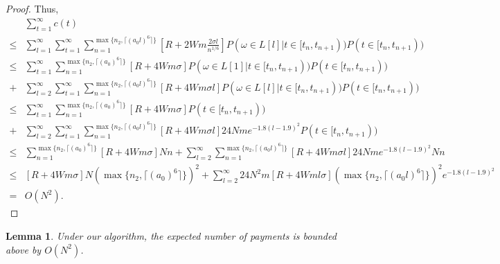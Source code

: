 \documentclass{article}
\newtheorem{lemma}{Lemma}
\begin{document}
\begin{proof}
Thus,
\begin{align}
&\sum_{t=1}^{\infty}c(t) \nonumber \\
\leq&\sum_{l=1}^{\infty}\sum_{t=1}^{\infty}\sum_{n=1}^{\max\{n_2,\lceil (a_0 l)^6 \rceil\}}\left[R+2Wm\frac{2\sigma l}{n^{1/6}}\right]P(\omega\in L[l]|t\in [t_n,t_{n+1}))P(t\in [t_n,t_{n+1})) \nonumber \\
\leq& \sum_{t=1}^{\infty}\sum_{n=1}^{\max\{n_2,\lceil (a_0)^6 \rceil\}}\left[R+4Wm\sigma \right]P(\omega\in L[1]|t\in [t_n,t_{n+1}))P(t\in [t_n,t_{n+1})) \nonumber \\
+&\sum_{l=2}^{\infty}\sum_{t=1}^{\infty}\sum_{n=1}^{\max\{n_2,\lceil (a_0 l)^6 \rceil\}}\left[R+4Wm\sigma l\right]P(\omega\in L[l]|t\in [t_n,t_{n+1}))P(t\in [t_n,t_{n+1})) \nonumber \\
\leq& \sum_{t=1}^{\infty}\sum_{n=1}^{\max\{n_2,\lceil (a_0)^6 \rceil\}}\left[R+4Wm\sigma \right]P(t\in [t_n,t_{n+1})) \nonumber \\
+&\sum_{l=2}^{\infty}\sum_{t=1}^{\infty}\sum_{n=1}^{\max\{n_2,\lceil (a_0 l)^6 \rceil\}}\left[R+4Wm\sigma l\right]24Nme^{-1.8(l-1.9)^2}P(t\in [t_n,t_{n+1})) \nonumber \\
\leq& \sum_{n=1}^{\max\{n_2,\lceil (a_0)^6 \rceil\}}\left[R+4Wm\sigma \right]Nn +\sum_{l=2}^{\infty}\sum_{n=1}^{\max\{n_2,\lceil (a_0 l)^6 \rceil\}}\left[R+4Wm\sigma l\right]24Nme^{-1.8(l-1.9)^2}Nn \nonumber \\
\leq & \left[R+4Wm\sigma \right]N (\max\{n_2,\lceil (a_0)^6 \rceil\})^2+\sum_{l=2}^{\infty}24N^2 m[R+4Wml\sigma](\max\{n_2,\lceil (a_0 l)^6 \rceil\})^2 e^{-1.8(l-1.9)^2} \nonumber \\
=& O(N^2). \nonumber
\end{align}

\end{proof}


\begin{lemma}
Under our algorithm, the expected number of payments is bounded above by $O(N^2)$.
\label{lemma:numP}
\end{lemma}
\end{document}
